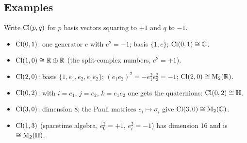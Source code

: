 \subsection{Examples}

\begin{example} Write $\mathrm{Cl}(p,q)$ for $p$ basis vectors squaring to $+1$ and $q$ to $-1$.
\begin{itemize}
  \item $\mathrm{Cl}(0,1)$: one generator $e$ with $e^2=-1$; basis $\{1,e\}$; $\mathrm{Cl}(0,1)\cong\mathbb{C}$.
  \item $\mathrm{Cl}(1,0)\cong\mathbb{R}\oplus\mathbb{R}$ (the split-complex numbers, $e^2=+1$).
  \item $\mathrm{Cl}(2,0)$: basis $\{1,e_1,e_2,e_1e_2\}$; $(e_1e_2)^2=-e_1^2e_2^2=-1$; $\mathrm{Cl}(2,0)\cong\mathrm{M}_2(\mathbb{R})$.
  \item $\mathrm{Cl}(0,2)$: with $i=e_1$, $j=e_2$, $k=e_1e_2$ one gets the quaternions: $\mathrm{Cl}(0,2)\cong\mathbb{H}$.
  \item $\mathrm{Cl}(3,0)$: dimension $8$; the Pauli matrices $e_i\mapsto\sigma_i$ give $\mathrm{Cl}(3,0)\cong\mathrm{M}_2(\mathbb{C})$.
  \item $\mathrm{Cl}(1,3)$ (spacetime algebra, $e_0^2=+1$, $e_i^2=-1$) has dimension $16$ and is $\cong\mathrm{M}_2(\mathbb{H})$.
\end{itemize}
\end{example}
